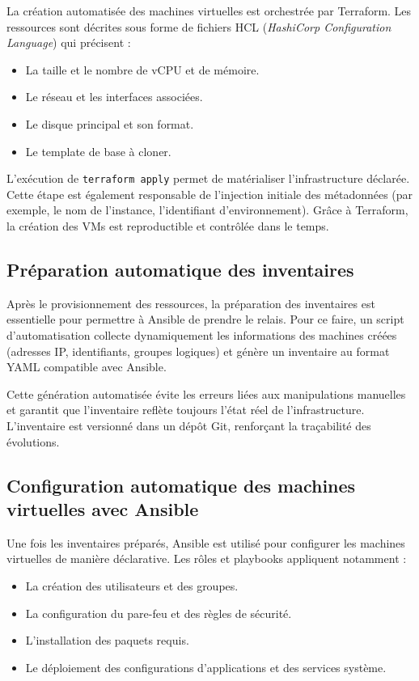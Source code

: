 La création automatisée des machines virtuelles est orchestrée par Terraform.
Les ressources sont décrites sous forme de fichiers HCL (\textit{HashiCorp Configuration Language}) qui précisent :
\begin{itemize}
	\item La taille et le nombre de vCPU et de mémoire.
	\item Le réseau et les interfaces associées.
	\item Le disque principal et son format.
	\item Le template de base à cloner.
\end{itemize}

L'exécution de \texttt{terraform apply} permet de matérialiser l'infrastructure déclarée.
Cette étape est également responsable de l'injection initiale des métadonnées (par exemple, le nom de l'instance, l'identifiant d'environnement).
Grâce à Terraform, la création des VMs est reproductible et contrôlée dans le temps.

\subsection{Préparation automatique des inventaires}

Après le provisionnement des ressources, la préparation des inventaires est essentielle pour permettre à Ansible de prendre le relais.
Pour ce faire, un script d'automatisation collecte dynamiquement les informations des machines créées (adresses IP, identifiants, groupes logiques) et génère un inventaire au format YAML compatible avec Ansible.

Cette génération automatisée évite les erreurs liées aux manipulations manuelles et garantit que l'inventaire reflète toujours l'état réel de l'infrastructure.
L'inventaire est versionné dans un dépôt Git, renforçant la traçabilité des évolutions.

\subsection{Configuration automatique des machines virtuelles avec Ansible}

Une fois les inventaires préparés, Ansible est utilisé pour configurer les machines virtuelles de manière déclarative.
Les rôles et playbooks appliquent notamment :
\begin{itemize}
	\item La création des utilisateurs et des groupes.
	\item La configuration du pare-feu et des règles de sécurité.
	\item L'installation des paquets requis.
	\item Le déploiement des configurations d’applications et des services système.
\end{itemize}

